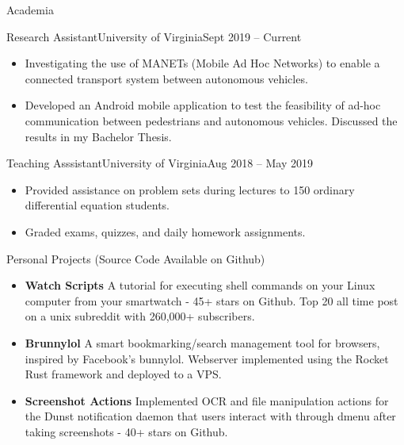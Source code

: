 \documentclass[]{mcdowellcv}
\begin{document}
\begin{cvsection}{Academia}
    \begin{cvsubsection}{Research Assistant}{University of Virginia}{Sept 2019 -- Current}
        \begin{itemize}%
            \item Investigating the use of MANETs (Mobile Ad Hoc Networks) to enable a connected transport system between autonomous vehicles.
            \item Developed an Android mobile application to test the feasibility of ad-hoc communication between pedestrians and autonomous vehicles. Discussed the results in my Bachelor Thesis.
        \end{itemize}
    \end{cvsubsection}
    \begin{cvsubsection}{Teaching Asssistant}{University of Virginia}{Aug 2018 -- May 2019}

        \begin{itemize}%
            \item Provided assistance on problem sets during lectures to 150 ordinary differential equation students.
            \item Graded exams, quizzes, and daily homework assignments.
        \end{itemize}
    \end{cvsubsection}
\end{cvsection}
\begin{cvsection}{Personal Projects (Source Code Available on Github)}
    \begin{cvsubsection}{}{}{}
        \begin{itemize}
            \setlength\itemsep{3pt}
            \item \textbf{Watch Scripts}  A tutorial for executing shell commands on your Linux computer from your smartwatch - 45+ stars on Github. Top 20 all time post on a unix subreddit with 260,000+ subscribers.
            \item \textbf{Brunnylol}  A smart bookmarking/search management tool for browsers, inspired by Facebook's bunnylol. Webserver implemented using the Rocket Rust framework and deployed to a VPS.
            \item \textbf{Screenshot Actions}  Implemented OCR and file manipulation actions for the Dunst notification daemon that users interact with through dmenu after taking screenshots - 40+ stars on Github.
        \end{itemize}
    \end{cvsubsection}
\end{cvsection}
\end{document}
